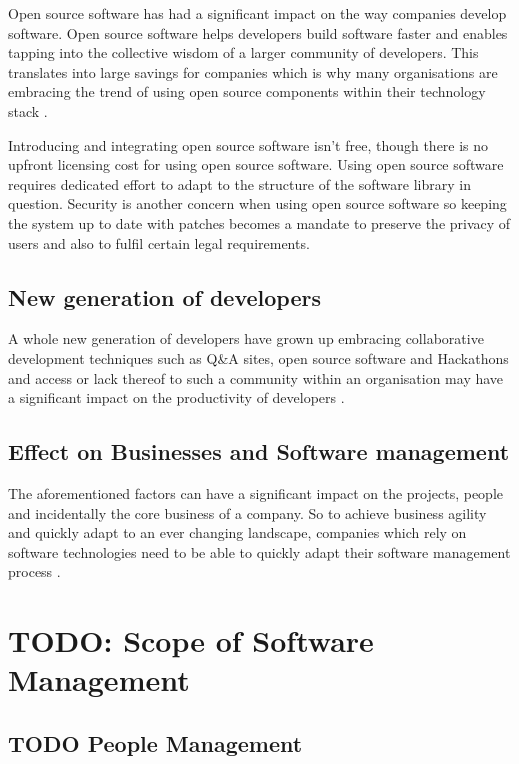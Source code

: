 \documentclass[10pt,conference]{IEEEtran}
\begin{document}
Open source software has had a significant impact on the way companies develop software. Open source software helps developers build software faster and enables tapping into the collective wisdom of a larger community of developers. This translates into large savings for companies which is why many organisations are embracing the trend of using open source components within their technology stack \cite{baldwin_4_2014} \cite{lemmens_open_2008}.

Introducing and integrating open source software isn't free, though there is no upfront licensing cost for using open source software. Using open source software requires dedicated effort to adapt to the structure of the software library in question. Security is another concern when using open source software so keeping the system up to date with patches becomes a mandate to preserve the privacy of users and also to fulfil certain legal requirements.

\subsection*{New generation of developers}

A whole new generation of developers have grown up embracing collaborative development techniques such as Q\&A sites, open source software and Hackathons and access or lack thereof to such a community within an organisation may have a significant impact on the productivity of developers \cite{vasilescu_continuous_2014}. 


\subsection*{Effect on Businesses and Software management}

The aforementioned factors can have a significant impact on the projects, people and incidentally the core business of a company. So to achieve business agility and quickly adapt to an ever changing landscape, companies which rely on software technologies need to be able to quickly adapt their software management process \cite{mathiassen_business_2006}.

\section*{TODO: Scope of Software Management}

\subsection*{TODO People Management}
\end{document}
